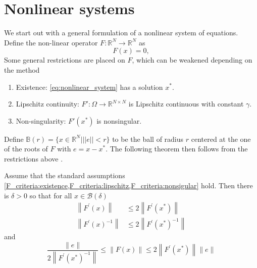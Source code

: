 \section{Nonlinear systems}\label{sec:nonlinear_systems}
We start out with a general formulation of a nonlinear system of equations. Define the non-linear operator $F: \mathbb{R}^N\rightarrow \mathbb{R}^N$ as
\begin{equation}
  F(x) = 0,
  \label{eq:nonlinear_system}
\end{equation}
Some general restrictions are placed on $F$, which can be weakened depending on the method
\begin{enumerate}[label=\roman*,ref=$F$-criterium \roman*]
  \item\label{F_criteria:existence} Existence: \ref{eq:nonlinear_system} has a solution $x^*$.
  \item\label{F_criteria:lipschitz} Lipschitz continuity: $F': \Omega \rightarrow \mathbb{R}^{N \times N}$ is Lipschitz continuous with constant $\gamma$.
  \item\label{F_criteria:nonsigular} Non-singularity: $F'(x^*)$ is nonsingular.
\end{enumerate}
Define $\mathbb{B}(r) = \{x\in\mathbb{R}^N| ||e||<r\}$ to be the ball of radius $r$ centered at the one of the roots of $F$ with $e = x-x^{*}$. The following theorem then follows from the restrictions above \cite[lemma 4.3.1]{nonlinear_cg_Kelley_1995}.
\begin{theorem}
  Assume that the standard assumptions \cref{F_criteria:existence,F_criteria:lipschitz,F_criteria:nonsigular} hold. Then there is $\delta>0$ so that for all $x \in \mathcal{B}(\delta)$
  \begin{align}
    \left\|F^{\prime}(x)\right\|      & \leq 2\left\|F^{\prime}\left(x^*\right)\right\|      \\
    \left\|F^{\prime}(x)^{-1}\right\| & \leq 2\left\|F^{\prime}\left(x^*\right)^{-1}\right\|
  \end{align}
  and
  \begin{equation}
    \frac{\|e\|}{2\left\|F^{\prime}\left(x^*\right)^{-1}\right\|}  \leq\|F(x)\| \leq 2\left\|F^{\prime}\left(x^*\right)\right\|\|e\|
  \end{equation}
  \label{thm:nonlinear_system}
\end{theorem}

